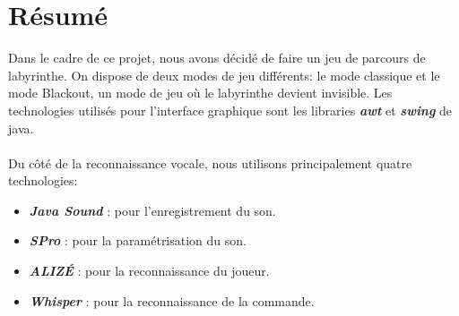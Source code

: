 \section{Résumé}
\label{sec:resume}

Dans le cadre de ce projet, nous avons décidé de faire un jeu de parcours de labyrinthe. On dispose de deux modes de jeu différents: le mode classique et le mode Blackout,
un mode de jeu où le labyrinthe devient invisible. Les technologies utilisés pour l'interface graphique sont les libraries \textbf{\textit{awt}} et \textbf{\textit{swing}} de java. \\\\
Du côté de la reconnaissance vocale, nous utilisons principalement quatre technologies:
\begin{itemize}
    \item \textbf{\textit{Java Sound}} : pour l'enregistrement du son.
    \item \textbf{\textit{SPro}} : pour la paramétrisation du son.
    \item \textbf{\textit{ALIZÉ}} : pour la reconnaissance du joueur.
    \item \textbf{\textit{Whisper}} : pour la reconnaissance de la commande.
\end{itemize}
